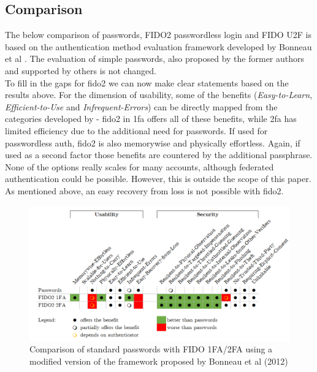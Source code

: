 \subsection{Comparison}
\label{subsec:comparison}

The below comparison of passwords, FIDO2 passwordless login and FIDO U2F is based on the authentication method evaluation framework developed by Bonneau et al \cite{bonneau2012}. The evaluation of simple passwords, also proposed by the former authors and supported by others \cite{lyastani2020} is not changed.\\
To fill in the gaps for \ac{fido2} we can now make clear statements based on the results above. For the dimension of usability, some of the benefits (\emph{Easy-to-Learn}, \emph{Efficient-to-Use} and \emph{Infrequent-Errors}) can be directly mapped from the categories developed by \cite{nielsen1993} - \ac{fido2} in \ac{1fa} offers all of these benefits, while \ac{2fa} has limited efficiency due to the additional need for passwords. If used for passwordless auth, \ac{fido2} is also memorywise and physically effortless. Again, if used as a second factor those benefits are countered by the additional passphrase. None of the options really scales for many accounts, although federated authentication could be possible. However, this is outside the scope of this paper. As mentioned above, an easy recovery from loss is not possible with \ac{fido2}.

\begin{figure}[!ht]
    \centering
    \includegraphics[width=1.8\columnwidth]{Figures/bonneau_matrix.png}
    \caption[Comparison of Authentication Methods]{Comparison of standard passwords with FIDO 1FA/2FA using a modified version of the framework proposed by Bonneau et al (2012)}
    \label{fig:bonneau_matrix}
\end{figure}

